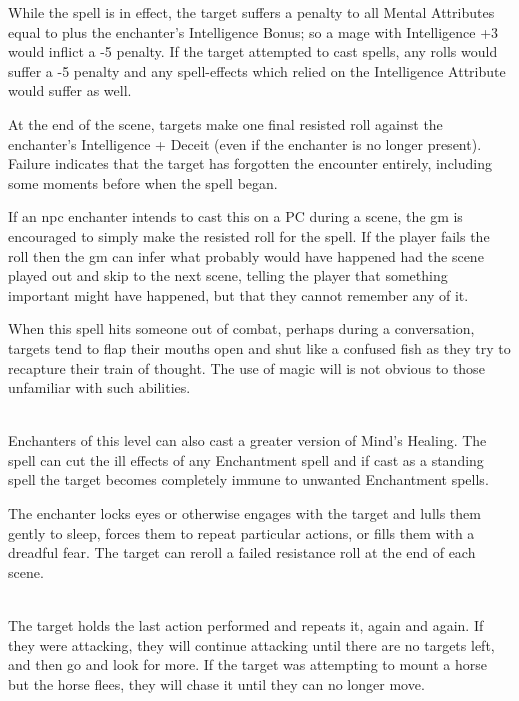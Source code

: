 \documentclass[titlepage,a4paper,openany]{book}
\begin{document}
\begin{multicols}{2}
While the spell is in effect, the target suffers a penalty to all Mental Attributes equal to  plus the enchanter's Intelligence Bonus; so a mage with Intelligence +3 would inflict a -5 penalty. If the target attempted to cast spells, any rolls would suffer a -5 penalty and any spell-effects which relied on the Intelligence Attribute would suffer as well.

At the end of the scene, targets make one final resisted roll against the enchanter's Intelligence + Deceit (even if the enchanter is no longer present). Failure indicates that the target has forgotten the encounter entirely, including some moments before when the spell began.

If an \gls{npc} enchanter intends to cast this on a PC during a scene, the \gls{gm} is encouraged to simply make the resisted roll for the spell. If the player fails the roll then the \gls{gm} can infer what probably would have happened had the scene played out and skip to the next scene, telling the player that something important might have happened, but that they cannot remember any of it.

When this spell hits someone out of combat, perhaps during a conversation, targets tend to flap their mouths open and shut like a confused fish as they try to recapture their train of thought. The use of magic will is not obvious to those unfamiliar with such abilities.

\\
Enchanters of this level can also cast a greater version of Mind's Healing. The spell can cut the ill effects of any Enchantment spell and if cast as a standing spell the target becomes completely immune to unwanted Enchantment spells.

\spelllevel

The enchanter locks eyes or otherwise engages with the target and lulls them gently to sleep, forces them to repeat particular actions, or fills them with a dreadful fear. The target can reroll a failed resistance roll at the end of each scene.

\\
The target holds the last action performed and repeats it, again and again.
If they were attacking, they will continue attacking until there are no targets left, and then go and look for more.
If the target was attempting to mount a horse but the horse flees, they will chase it until they can no longer move.


\end{multicols}
\end{document}
